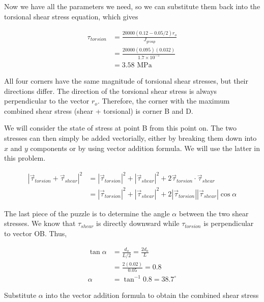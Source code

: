 \documentclass[a4paper,openany,nobib]{tufte-book}
\begin{document}
{{Now we have all the parameters we need, so we can substitute them back
into the torsional shear stress equation, which gives

$$\begin{aligned}
     \tau_{torsion} &= \frac{20000(0.12-0.05/2) r_o}{J_{group}} \\
                    &= \frac{20000(0.095)(0.032)}{1.7 \times 10^{-5}} \\
                    &= 3.58 \text{ MPa}
   \end{aligned}$$

All four corners have the same magnitude of torsional shear stresses,
but their directions differ. The direction of the torsional shear stress
is always perpendicular to the vector \(r_o\). Therefore, the corner with
the maximum combined shear stress (shear + torsional) is corner B and D.


We will consider the state of stress at point B from this point on. The
two stresses can then simply be added vectorially, either by breaking
them down into \(x\) and \(y\) components or by using vector addition
formula. We will use the latter in this problem.

$$\begin{aligned}
    \left| \vec{\tau}_{torsion} + \vec{\tau}_{shear} \right|^2 &= \left| \vec{\tau}_{torsion} \right|^2 + \left| \vec{\tau}_{shear} \right|^2 + 2 \vec{\tau}_{torsion} \cdot \vec{\tau}_{shear} \\
                                                               &= \left| \vec{\tau}_{torsion} \right|^2 + \left| \vec{\tau}_{shear} \right|^2 + 2 \left| \vec{\tau}_{torsion} \right| \left| \vec{\tau}_{shear} \right| \cos \alpha
  \end{aligned}$$

The last piece of the puzzle is to determine the angle \(\alpha\) between
the two shear stresses. We know that \(\tau_{shear}\) is directly downward
while \(\tau_{torsion}\) is perpendicular to vector OB. Thus,

$$\begin{aligned}
    \tan \alpha &= \frac{d_o}{L/2} = \frac{2 d_o}{L} \\
                &= \frac{2(0.02)}{0.05} = 0.8 \\
    \alpha &= \tan^{-1} 0.8 = 38.7^{\circ}
  \end{aligned}$$

Substitute \(\alpha\) into the vector addition formula to obtain the
combined shear stress

}}
\end{document}
